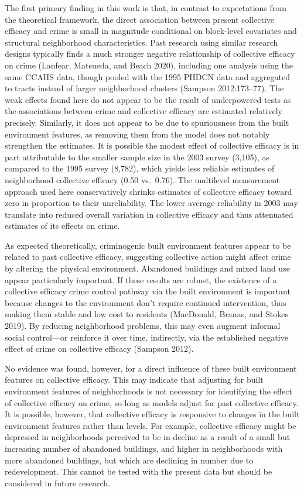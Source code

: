 \documentclass [11pt, proquest] {uwthesis}[2015/03/03]
\begin{document}
The first primary finding in this work is that, in contrast to expectations from the theoretical framework, the direct association between present collective efficacy and crime is small in magnitude conditional on block-level covariates and structural neighborhood characteristics. Past research using similar research designs typically finds a much stronger negative relationship of collective efficacy on crime (Lanfear, Matsueda, and Beach 2020), including one analysis using the same CCAHS data, though pooled with the 1995 PHDCN data and aggregated to tracts instead of larger neighborhood clusters (Sampson 2012:173--77). The weak effects found here do not appear to be the result of underpowered tests as the associations between crime and collective efficacy are estimated relatively precisely. Similarly, it does not appear to be due to spuriousness from the built environment features, as removing them from the model does not notably strengthen the estimates. It is possible the modest effect of collective efficacy is in part attributable to the smaller sample size in the 2003 survey (3,105), as compared to the 1995 survey (8,782), which yields less reliable estimates of neighborhood collective efficacy (0.50 vs.~0.76). The multilevel measurement approach used here conservatively shrinks estimates of collective efficacy toward zero in proportion to their unreliability. The lower average reliability in 2003 may translate into reduced overall variation in collective efficacy and thus attenuated estimates of its effects on crime.

As expected theoretically, criminogenic built environment features appear to be related to past collective efficacy, suggesting collective action might affect crime by altering the physical environment. Abandoned buildings and mixed land use appear particularly important. If these results are robust, the existence of a collective efficacy crime control pathway via the built environment is important because changes to the environment don't require continued intervention, thus making them stable and low cost to residents (MacDonald, Branas, and Stokes 2019). By reducing neighborhood problems, this may even augment informal social control---or reinforce it over time, indirectly, via the established negative effect of crime on collective efficacy (Sampson 2012).

No evidence was found, however, for a direct influence of these built environment features on collective efficacy. This may indicate that adjusting for built environment features of neighborhoods is not necessary for identifying the effect of collective efficacy on crime, so long as models adjust for past collective efficacy. It is possible, however, that collective efficacy is responsive to changes in the built environment features rather than levels. For example, collective efficacy might be depressed in neighborhoods perceived to be in decline as a result of a small but increasing number of abandoned buildings, and higher in neighborhoods with more abandoned buildings, but which are declining in number due to redevelopment. This cannot be tested with the present data but should be considered in future research.
\end{document}
